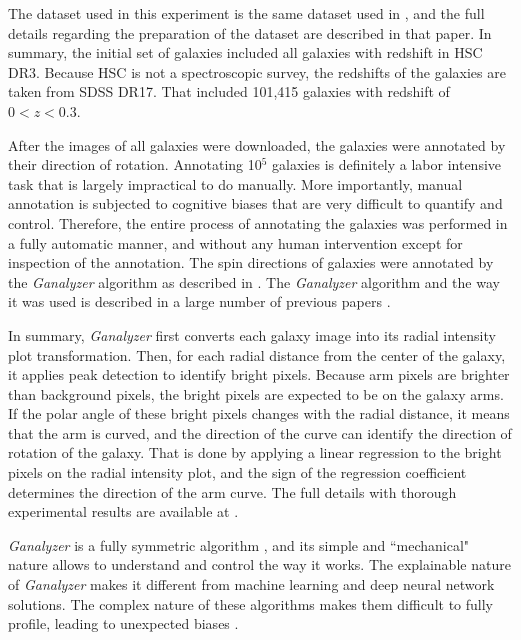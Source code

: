 \documentclass[final,5p,times,twocolumn]{article}
\begin{document}
The dataset used in this experiment is the same dataset used in \citep{shamir2024empirical}, and the full details regarding the preparation of the dataset are described in that paper. In summary, the initial set of galaxies included all galaxies with redshift in HSC DR3. Because HSC is not a spectroscopic survey, the redshifts of the galaxies are taken from SDSS DR17. That included 101,415 galaxies with redshift of $0<z<0.3$. 

After the images of all galaxies were downloaded, the galaxies were annotated by their direction of rotation. Annotating 10$^5$ galaxies is definitely a labor intensive task that is largely impractical to do manually. More importantly, manual annotation is subjected to cognitive biases that are very difficult to quantify and control. Therefore, the entire process of annotating the galaxies was performed in a fully automatic manner, and without any human intervention except for inspection of the annotation. The spin directions of galaxies were annotated by the {\it Ganalyzer} algorithm \citep{shamir2011ganalyzer,ganalyzer_ascl} as described in \citep{universe10030129,shamir2024empirical,shamir2021large,shamir2022large,shamir2022analysis,shamir2022analysis2,shamir2022asymmetry}. The {\it Ganalyzer} algorithm and the way it was used is described in a large number of previous papers \citep{shamir2011ganalyzer,universe10030129,shamir2024empirical,shamir2021large,shamir2022large,shamir2022analysis,shamir2022analysis2,shamir2022asymmetry}. 

In summary, {\it Ganalyzer} first converts each galaxy image into its radial intensity plot transformation. Then, for each radial distance from the center of the galaxy, it applies peak detection to identify bright pixels. Because arm pixels are brighter than background pixels, the bright pixels are expected to be on the galaxy arms. If the polar angle of these bright pixels changes with the radial distance, it means that the arm is curved, and the direction of the curve can identify the direction of rotation of the galaxy. That is done by applying a linear regression to the bright pixels on the radial intensity plot, and the sign of the regression coefficient determines the direction of the arm curve. The full details with thorough experimental results are available at \citep{shamir2011ganalyzer,universe10030129,shamir2024empirical,shamir2021large,shamir2022large,shamir2022analysis,shamir2022analysis2,shamir2022asymmetry}.

{\it Ganalyzer} is a fully symmetric algorithm \citep{shamir2011ganalyzer}, and its simple and ``mechanical" nature allows to understand and control the way it works. The explainable nature of {\it Ganalyzer} makes it different from machine learning and deep neural network solutions. The complex nature of these algorithms makes them difficult to fully profile, leading to unexpected biases \citep{ball2023,dhar2022systematic}. 
\end{document}
